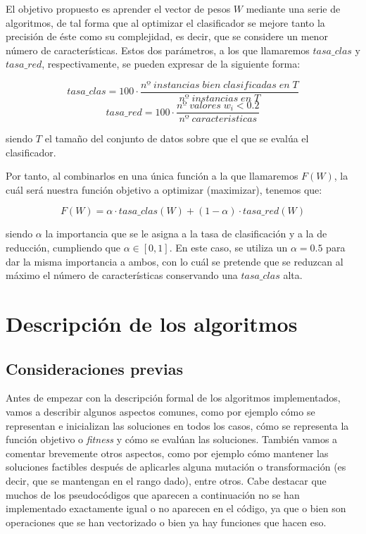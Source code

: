 \documentclass[11pt,a4paper]{article}
\begin{document}
El objetivo propuesto es aprender el vector de pesos $W$
mediante una serie de algoritmos, de tal forma que al optimizar el clasificador se mejore tanto la precisión de éste como su
complejidad, es decir, que se considere un menor número de características. Estos dos parámetros, a los que llamaremos $tasa\_
clas$ y $tasa\_red$, respectivamente, se pueden expresar de la siguiente forma:

\[tasa\_clas = 100 \cdot \frac{nº \; instancias \; bien \; clasificadas \; en \; T}{nº \; instancias \; en \; T}\]
\[tasa\_red = 100 \cdot \frac{nº \; valores \; w_i < 0.2}{nº \; caracteristicas}\]

\noindent siendo $T$ el tamaño del conjunto de datos sobre que el que se evalúa el clasificador.\par

Por tanto, al combinarlos en una única función a la que llamaremos $F(W)$, la cuál será nuestra función objetivo a optimizar
(maximizar), tenemos que:

\[F(W) = \alpha \cdot tasa\_clas(W) + (1 - \alpha) \cdot tasa\_red(W)\] 

\noindent siendo $\alpha$ la importancia que se le asigna a la tasa de clasificación y a la de reducción, cumpliendo que
$\alpha \in [0, 1]$. En este caso, se utiliza un $\alpha = 0.5$ para dar la misma importancia a ambos, con lo cuál se pretende
que se reduzcan al máximo el número de características conservando una $tasa\_clas$ alta.

\section{Descripción de los algoritmos}

\subsection{Consideraciones previas}

Antes de empezar con la descripción formal de los algoritmos implementados, vamos a describir algunos aspectos
comunes, como por ejemplo cómo se representan e inicializan las soluciones en todos los casos, cómo se representa la función
objetivo o \textit{fitness} y cómo se evalúan las soluciones. También vamos a comentar brevemente otros aspectos, como por
ejemplo cómo mantener las soluciones factibles después de aplicarles alguna mutación o transformación (es decir, que se
mantengan en el rango dado), entre otros.
Cabe destacar que muchos de los pseudocódigos que aparecen a continuación no se han implementado exactamente igual o no aparecen
en el código, ya que o bien son operaciones que se han vectorizado o bien ya hay funciones que hacen eso.
\end{document}
